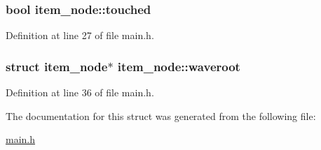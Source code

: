 \subsubsection[{touched}]{\setlength{\rightskip}{0pt plus 5cm}bool item\+\_\+node\+::touched}\hypertarget{structitem__node_afbb25b821a00049b840588c90e0fe61f}{}\label{structitem__node_afbb25b821a00049b840588c90e0fe61f}


Definition at line 27 of file main.\+h.

\subsubsection[{waveroot}]{\setlength{\rightskip}{0pt plus 5cm}struct {\bf item\+\_\+node}$\ast$ item\+\_\+node\+::waveroot}\hypertarget{structitem__node_a42ec4577ca5274298633cd22b51568cc}{}\label{structitem__node_a42ec4577ca5274298633cd22b51568cc}


Definition at line 36 of file main.\+h.



The documentation for this struct was generated from the following file\+:\begin{DoxyCompactItemize}
\item 
\hyperlink{main_8h}{main.\+h}\end{DoxyCompactItemize}

